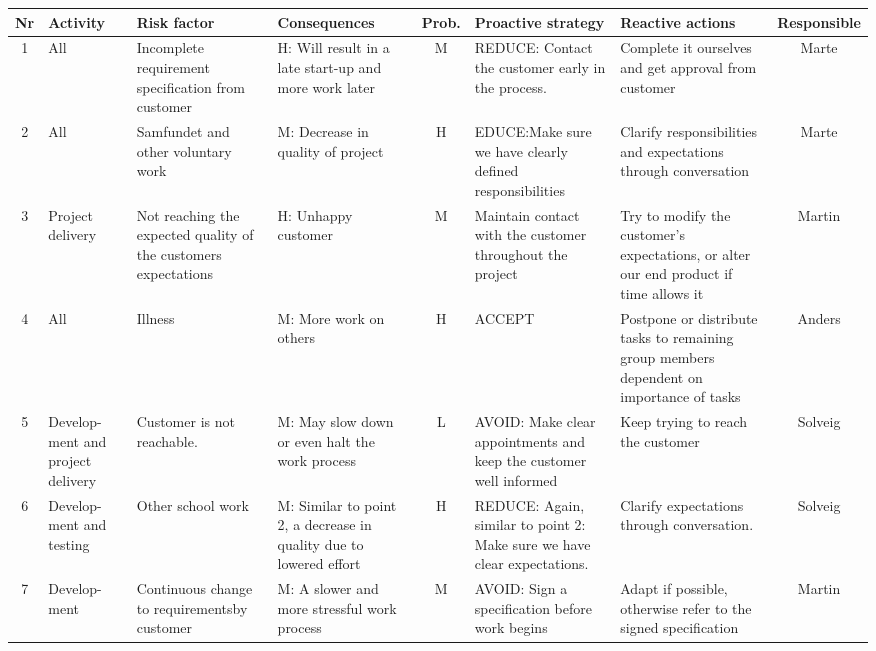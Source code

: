 \pagestyle{empty}
\begin{landscape}
	\addtolength{\oddsidemargin}{-.8in}
	\addtolength{\topmargin}{0.5in}
  \begin{table}
	\begin{tabular}{| c | p{1.5cm} | p{4cm} | p{4cm} | c | p{4cm} | p{4cm} | c |}
    \hline
    \rowcolor{gray}
   	{\bf Nr} & {\bf Activity} & {\bf Risk factor} & {\bf Consequences} & {\bf Prob.} & {\bf Proactive strategy} & {\bf Reactive actions} & {\bf Responsible} \\ \hline

   	1 & All & Incomplete requirement specification from customer & H: Will result in a late start-up and more work later & M & REDUCE: Contact the customer early in the process. & Complete it ourselves and get approval from customer & Marte \\ \hline

   	2 & All & Samfundet and other voluntary work & M: Decrease in quality of project & H & EDUCE:Make sure we have clearly defined responsibilities & Clarify responsibilities and expectations through conversation & Marte \\ \hline

   	3 & Project delivery & Not reaching the expected quality of the customers expectations & H: Unhappy customer & M & Maintain contact with the customer throughout the project & Try to modify the customer’s expectations, or alter our end product if time allows it & Martin \\ \hline

   	4 & All & Illness & M: More work on others & H & ACCEPT & Postpone or distribute tasks to remaining group members dependent on importance of tasks & Anders \\ \hline

   	5 & Develop- ment and project delivery & Customer is not reachable. & M: May slow down or even halt the work process & L &
   	AVOID: Make clear appointments and keep the customer well informed & Keep trying to reach the customer & Solveig \\ \hline

   	6 & Develop- ment and testing & Other school work & M: Similar to point 2, a decrease in quality due to lowered effort& H & REDUCE: Again, similar to point 2: Make sure we have clear expectations. & 
	Clarify expectations through conversation. & Solveig \\ \hline

   	7 & Develop- ment & Continuous change to requirementsby customer & M: A slower and more stressful work process & M & AVOID: Sign a specification before work begins & Adapt if possible, otherwise refer to the signed specification & Martin \\ \hline


\end{tabular}
\end{table}
\end{landscape}
